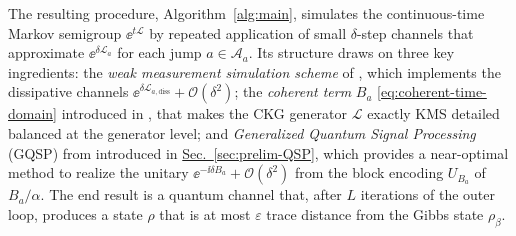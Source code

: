 The resulting procedure, Algorithm~\eqref{alg:main}, simulates the continuous-time Markov semigroup $\ee^{t \mathcal{L}}$ by repeated application of small $\delta$-step channels that approximate $\ee^{\delta \mathcal{L}_a}$ for each jump $a\in\mathcal{A}_a$. Its structure draws on three key ingredients: the \emph{weak measurement simulation scheme} of \cite{chen2023quantum}, which implements the dissipative channels $\ee^{\delta \mathcal{L}_{a, \text{diss}}} + \mathcal{O}(\delta^2)$; the \emph{coherent term} $B_a$ \eqref{eq:coherent-time-domain} introduced in \cite{chen2023efficient}, that makes the CKG generator $\mathcal{L}$ exactly KMS detailed balanced at the generator level; and \emph{Generalized Quantum Signal Processing} (GQSP) from \cite{motlagh2024generalized} introduced in \hyperref[sec:prelim-QSP]{Sec.~\ref*{sec:prelim-QSP}}, which provides a near-optimal method to realize the unitary $\ee^{-\ii \delta B_a} + \mathcal{O}(\delta^2)$ from the block encoding $U_{B_a}$ of $B_a / \alpha$.
The end result is a quantum channel that, after $L$ iterations of the outer loop, produces a state $\rho$ that is at most $\varepsilon$ trace distance from the Gibbs state $\rho_\beta$.

